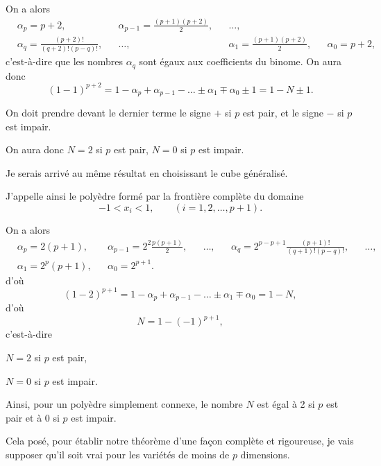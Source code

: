 \documentclass{article}
\begin{document}
On a alors
\[ \begin{aligned} &\alpha_{p} = p + 2, &&\alpha_{p-1} = \frac{(p + 1)(p + 2)}{2}, &&\ldots,\\ &\alpha_{q} = \frac{(p + 2)!}{(q + 2)!(p - q)!}, &&\ldots, &&\alpha_{1} = \frac{(p + 1)(p + 2)}{2}, &&\alpha_{0} = p + 2, \end{aligned} \]
c'est-à-dire que les nombres $\alpha_{q}$ sont égaux aux coefficients du binome.
On aura donc
\[ (1 - 1)^{p+2} = 1 - \alpha_{p} + \alpha_{p-1} - \ldots \pm \alpha_{1} \mp \alpha_{0} \pm 1 = 1 - N \pm 1. \]

On doit prendre devant le dernier terme le signe $+$ si $p$ est pair, et le signe $-$ si $p$ est impair.

On aura donc $N = 2$ si $p$ est pair, $N = 0$ si $p$ est impair.

Je serais arrivé au même résultat en choisissant le cube généralisé.

J'appelle ainsi le polyèdre formé par la frontière complète du domaine
\[ -1 < x_{i} < 1, \qquad (i = 1, 2, \ldots, p + 1). \]

On a alors
\[ \begin{aligned} &\alpha_{p} = 2(p + 1), &&\alpha_{p-1} = 2^{2}\frac{p(p + 1)}{2}, &&\ldots, &&\alpha_{q} = 2^{p-p+1}\frac{(p + 1)!}{(q + 1)!(p - q)!}, &&\ldots,\\ &\alpha_{1} = 2^{p}(p + 1), &&\alpha_{0} = 2^{p+1}. \end{aligned} \]
d'où
\[ (1 - 2)^{p+1} = 1 - \alpha_{p} + \alpha_{p-1} - \ldots \pm \alpha_{1} \mp \alpha_{0} = 1 - N, \]
d'où
\[ N = 1 - (-1)^{p+1}, \]
c'est-à-dire

$N = 2$ si $p$ est pair,

$N = 0$ si $p$ est impair.

Ainsi, pour un polyèdre simplement connexe, le nombre $N$ est égal à 2 si $p$ est pair et à 0 si $p$ est impair.

Cela posé, pour établir notre théorème d'une façon complète et rigoureuse, je vais supposer qu'il soit vrai pour les variétés de moins de $p$ dimensions.
\end{document}
